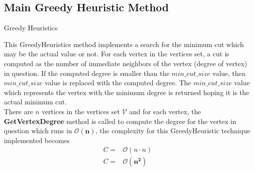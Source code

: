 \documentclass[longpaper, english, final, times]{revdetua}
\begin{document}
		\subsection{Main Greedy Heuristic Method}
			\begin{algorithm}
				\caption{Greedy Heuristics}
				\label{algorithm:GreedyHeuristics}
				\DontPrintSemicolon
				
				
				
			\end{algorithm}
			
			This GreedyHeuristics method implements a search for the minimum cut which may be the actual value or not. For each vertex in the vertices set, a cut is computed as the number of immediate neighbors of the vertex (degree of vertex) in question. If the computed degree is smaller than the $min\_cut\_size$ value, then $min\_cut\_size$  value is replaced with the computed degree. The $min\_cut\_size$ value which represents the vertex with the minimum degree is returned hoping it is the actual minimum cut. \\
			
			There are $n$ vertices in the vertices set $\mathcal{V}$ and for each vertex, the \textbf{GetVertexDegree} method is called to compute the degree for the vertex in question which runs in $\mathbf{\mathcal{O}(n)}$, the complexity for this GreedyHeuristic technique implemented becomes
			\begin{align*}
				C =& \mathcal{O}(n\cdot n) \\
				C =& \mathbf{\mathcal{O}(n^2)}
			\end{align*}
	
	
\end{document}
